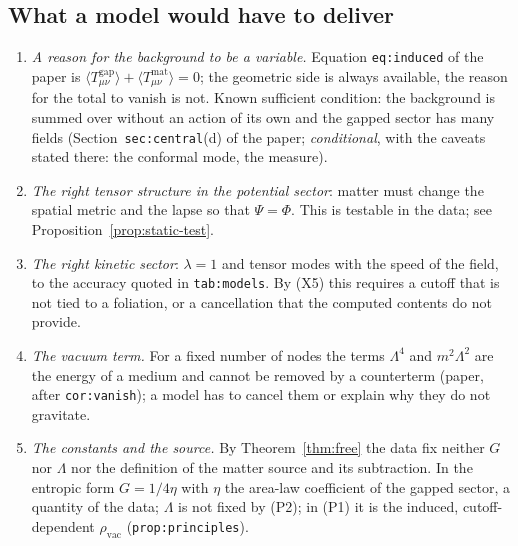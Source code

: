 \documentclass[a4paper,11pt]{article}
\theoremstyle{definition}
\theoremstyle{remark}
\begin{document}
\subsection{What a model would have to deliver}

\begin{enumerate}
\item[(R1)] \emph{A reason for the background to be a variable.} Equation \texttt{eq:induced} of the paper is $\langle T^{\mathrm{gap}}_{\mu\nu}\rangle+\langle T^{\mathrm{mat}}_{\mu\nu}\rangle=0$; the geometric side is always available, the reason for the total to vanish is not. Known sufficient condition: the background is summed over without an action of its own and the gapped sector has many fields (Section~\texttt{sec:central}(d) of the paper; \emph{conditional}, with the caveats stated there: the conformal mode, the measure).
\item[(R2)] \emph{The right tensor structure in the potential sector}: matter must change the spatial metric and the lapse so that $\Psi=\Phi$. This is testable in the data; see Proposition~\ref{prop:static-test}.
\item[(R3)] \emph{The right kinetic sector}: $\lambda=1$ and tensor modes with the speed of the field, to the accuracy quoted in \texttt{tab:models}. By (X5) this requires a cutoff that is not tied to a foliation, or a cancellation that the computed contents do not provide.
\item[(R4)] \emph{The vacuum term.} For a fixed number of nodes the terms $\Lambda^4$ and $m^2\Lambda^2$ are the energy of a medium and cannot be removed by a counterterm (paper, after \texttt{cor:vanish}); a model has to cancel them or explain why they do not gravitate.
\item[(R5)] \emph{The constants and the source.} By Theorem~\ref{thm:free} the data fix neither $G$ nor $\Lambda$ nor the definition of the matter source and its subtraction. In the entropic form $G=1/4\eta$ with $\eta$ the area-law coefficient of the gapped sector, a quantity of the data; $\Lambda$ is not fixed by (P2); in (P1) it is the induced, cutoff-dependent $\rho_{\mathrm{vac}}$ (\texttt{prop:principles}).
\end{enumerate}
\end{document}
